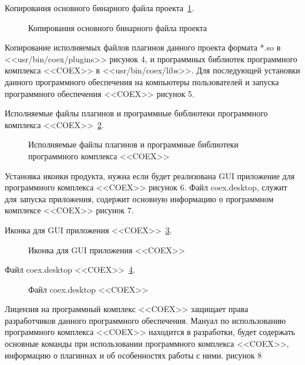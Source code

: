Копирования основного бинарного файла проекта~\ref{cpcoex:cpcoex}.

\begin{figure}[h!]
\caption{Копирования основного бинарного файла проекта}
\label{cpcoex:cpcoex}
\end{figure}


Копирование исполняемых файлов плагинов данного проекта формата *.so в <<usr/bin/coex/plugins>> рисунок 4, и программных библиотек программного комплекса <<COEX>> в <<usr/bin/coex/libs>>. Для последующей установки данного программного обеспечения на компьютеры пользователей и запуска программного обеспечения <<COEX>> рисунок 5. 

Исполняемые файлы плагинов и программные библиотеки программного комплекса <<COEX>>~\ref{PluginsAndLibs:PluginsAndLibs}.

\begin{figure}[h!]
\caption{Исполняемые файлы плагинов и программные библиотеки программного комплекса <<COEX>>}
\label{PluginsAndLibs:PluginsAndLibs}
\end{figure}

Установка иконки продукта, нужна если будет реализована GUI приложение для программного комплекса <<COEX>> рисунок 6. Файл coex.desktop, служит для запуска приложения, содержит основную информацию о программном комплексе <<COEX>> рисунок 7.

Иконка для GUI приложения <<COEX>>~\ref{image:image}.

\begin{figure}[h!]
\caption{ Иконка для GUI приложения <<COEX>> }
\label{image:image}
\end{figure}

Файл coex.desktop <<COEX>>~\ref{Aplicatio:Aplicatio}.

\begin{figure}[h!]
\caption{ Файл coex.desktop <<COEX>> }
\label{Aplicatio:Aplicatio}
\end{figure}

Лицензия на программный комплекс <<COEX>> защищает права разработчиков данного программного обеспечения. Мануал по использованию программного комплекса <<COEX>> находится в разработки, будет содержать основные команды при использовании программного комплекса <<COEX>>, информацию о плагиннах и об особенностях работы с ними. рисунок 8

